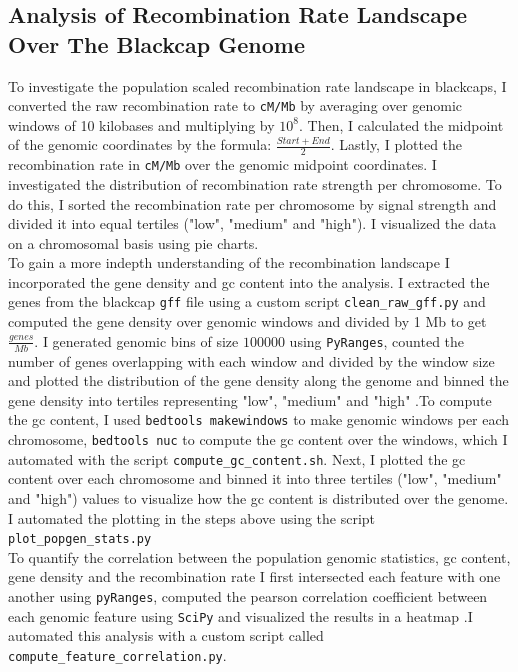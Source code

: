 \documentclass[12pt,a4paper]{article}
\begin{document}
\subsection{Analysis of Recombination Rate Landscape Over The Blackcap Genome}

To investigate the population scaled recombination rate landscape in blackcaps, I
converted the raw recombination rate to \texttt{cM/Mb} by averaging over
genomic windows of 10 kilobases and multiplying by $10^8$. Then, I calculated
the midpoint of the genomic coordinates by the formula: $\frac{Start +End}{2}$.
Lastly, I plotted the recombination rate in \texttt{cM/Mb} over the
genomic midpoint coordinates. I investigated the distribution of
recombination rate strength per chromosome. To do this, I sorted the
recombination rate per chromosome by signal strength and divided it into equal
tertiles ("low", "medium" and "high"). I visualized the data on a chromosomal
basis using pie charts. \\
To gain a more in\-depth understanding of the recombination landscape I
incorporated the gene density and gc content into the analysis. I extracted the
genes from the blackcap \texttt{gff} file using a custom script
\texttt{clean\_raw\_gff.py} and computed the gene density over genomic windows and divided
by 1 Mb to get $\frac{genes}{Mb}$. I generated genomic bins of size $100000$ using \texttt{PyRanges},
counted the number of genes overlapping with each window and divided by the
window size and plotted the distribution of the gene density along the genome
and binned the gene density into tertiles representing "low", "medium" and
"high"
.To compute the gc content, I used \texttt{bedtools makewindows} to make genomic windows
per each chromosome, \texttt{bedtools nuc} to compute the gc content over the windows,
which I automated with the script \texttt{compute\_gc\_content.sh}.
Next, I plotted the gc content over each
chromosome and binned it into three tertiles ("low", "medium" and "high")
values to visualize how the gc content is distributed over the genome. I
automated the plotting in the steps above using the script
\texttt{plot\_popgen\_stats.py} \\

To quantify the correlation between the population genomic statistics, gc
content, gene density and the recombination rate I first intersected each
feature with one another using \texttt{pyRanges}, computed the pearson
correlation coefficient between each genomic feature using \texttt{SciPy} and
visualized the results in a heatmap \parencite{2020SciPy-NMeth}.I automated
this analysis with a custom script called
\texttt{compute\_feature\_correlation.py}. \\
\end{document}
